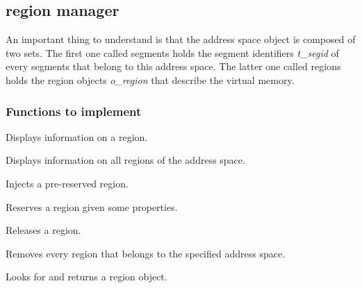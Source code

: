\subsection{region manager}

An important thing to understand is that the address space object
is composed of two sets. The first one called segments holds the
segment identifiers \textit{t\_segid} of every segments that belong
to this address space. The latter one called regions holds the
region objects \textit{o\_region} that describe the virtual memory.

\subsubsection{Functions to implement}

	  {Displays information on a region.}

	  {Displays information on all regions of the address space.}

	  {Injects a pre-reserved region.}

	  {Reserves a region given some properties.}

	  {Releases a region.}

	  {Removes every region that belongs to the specified address space.}

	  {Looks for and returns a region object.}

